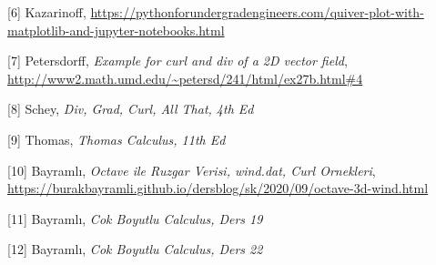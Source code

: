 \documentclass[12pt,fleqn]{article}\usepackage{../../common}
\begin{document}
[6] Kazarinoff, \url{https://pythonforundergradengineers.com/quiver-plot-with-matplotlib-and-jupyter-notebooks.html}

[7] Petersdorff, {\em Example for curl and div of a 2D vector field}, \url{http://www2.math.umd.edu/~petersd/241/html/ex27b.html#4}

[8] Schey, {\em Div, Grad, Curl, All That, 4th Ed}

[9] Thomas, {\em Thomas Calculus, 11th Ed}

[10] Bayramlı, {\em Octave ile Ruzgar Verisi, wind.dat, Curl Ornekleri},
     \url{https://burakbayramli.github.io/dersblog/sk/2020/09/octave-3d-wind.html}

[11] Bayramlı, {\em Cok Boyutlu Calculus, Ders 19}
     
[12] Bayramlı, {\em Cok Boyutlu Calculus, Ders 22}
     
\end{document}
